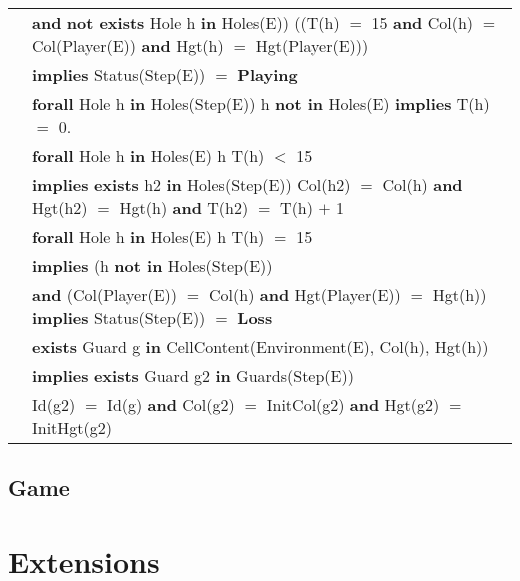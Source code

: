 \documentclass[8pt]{article}
\begin{document}
{\begin{longtable}{rl}
  & \quad\quad \textbf{and} \textbf{not exists} \textrm{Hole} h \textbf{in} \textrm{Holes(E))} (\textrm(T(h) $=$ 15 \textbf{and} \textrm{Col(h)} $=$ \textrm{Col(Player(E))} \textbf{and} \textrm{Hgt(h)} $=$ \textrm{Hgt(Player(E))})\\
  & \quad\quad \textbf{implies} \textrm{Status(Step(E))} $=$ \textbf{Playing}\\
  & \textbf{forall} \textrm{Hole} h \textbf{in} \textrm{Holes(Step(E))} h \textbf{not in} \textrm{Holes(E)} \textbf{implies} \textrm{T(h)} $=$ 0.\\
  & \textbf{forall} \textrm{Hole} h \textbf{in} \textrm{Holes(E)} h \textrm{T(h)} $<$ 15\\
  & \quad\quad \textbf{implies} \textbf{exists} h2 \textbf{in} \textrm{Holes(Step(E))} \textrm{Col(h2)} $=$ \textrm{Col(h)} \textbf{and} \textrm{Hgt(h2)} $=$ \textrm{Hgt(h)} \textbf{and} \textrm{T(h2)} $=$ \textrm{T(h)} $+$ 1\\
  & \textbf{forall} \textrm{Hole} h \textbf{in} \textrm{Holes(E)} h \textrm{T(h)} $=$ 15\\
  & \quad\quad \textbf{implies} (h \textbf{not in} \textrm{Holes(Step(E))}\\
  & \quad\quad\quad\quad \textbf{and} (\textrm{Col(Player(E))} $=$ \textrm{Col(h)} \textbf{and} \textrm{Hgt(Player(E))} $=$ \textrm{Hgt(h)}) \textbf{implies} \textrm{Status(Step(E))} $=$ \textbf{Loss}\\
  & \quad\quad\quad\quad \textbf{exists} \textrm{Guard} g \textbf{in} \textrm{CellContent(Environment(E), Col(h), Hgt(h))}\\
  & \quad\quad\quad\quad\quad\quad \textbf{implies} \textbf{exists} \textrm{Guard} g2 \textbf{in} \textrm{Guards(Step(E))}\\
  & \quad\quad\quad\quad\quad\quad\quad \textrm{Id(g2)} $=$ \textrm{Id(g)} \textbf{and} \textrm{Col(g2)} $=$ \textrm{InitCol(g2)} \textbf{and} \textrm{Hgt(g2)} $=$ \textrm{InitHgt(g2)}\\
\end{longtable}}

\subsection{Game}

\section{Extensions}
\end{document}
